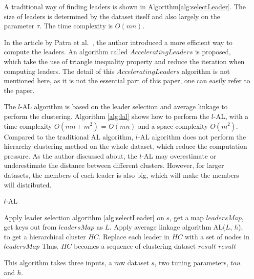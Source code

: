 \documentclass[utf8,english]{gradu3}
\begin{document}
A traditional way of finding leaders is shown in Algorithm\ref{alg:selectLeader}. The size of leaders is determined by the dataset itself and also largely on the parameter $\tau$. The time complexity is $O(mn)$.

In the article by Patra et al.~\cite{patra2010distance}, the author introduced a more efficient way to compute the leaders. An algorithm called $Accelerating Leaders$ is proposed, which take the use of triangle inequality property and reduce the iteration when computing leaders. The detail of this $Accelerating Leaders$ algorithm is not mentioned here, as it is not the essential part of this paper, one can easily refer to the paper.


The $l$-AL algorithm is based on the leader selection and average linkage to perform the clustering. 
Algorithm \ref*{alg:lal} shows how to perform the $l$-AL, with a time complexity $O(mn + m^2)$ = $O(mn)$ and a space complexity $O(m^2)$.
Compared to the traditional AL algorithm, $l$-AL algorithm does not perform the hierarchy clustering method on the whole dataset, which reduce the computation pressure. 
As the author discussed about, the $l$-AL may overestimate or underestimate the distance between different clusters.
However, for larger datasets, the members of each leader is also big, which will make the members will distributed.


\algrenewcommand\Return{\State \algorithmicreturn{} }
\begin{algorithm}[h]
	\caption{$l$-AL}
	\label{alg:lal}
	\begin{algorithmic}[1]
		\State Apply leader selection algorithm \ref{alg:selectLeader} on $s$, get a map $leadersMap$, get keys out from $leadersMap$ as $L$.
		\State Apply average linkage algorithm AL($L$, $h$), to get a hierarchical cluster $HC$.
		\State Replace each leader in $HC$ with a set of nodes in $leadersMap$
		\State Thus, $HC$ becomes a sequence of clustering dataset $result$
		\Return $result$
		\EndProcedure
		
		This algorithm takes three inputs, a raw dataset $s$, two tuning parameters, $tau$ and $h$.
	\end{algorithmic}
\end{algorithm}

\end{document}

